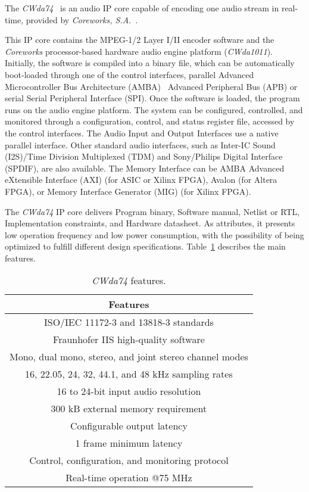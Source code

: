 The \textit{CWda74}~\cite{CWda74} is an audio IP core capable of encoding one audio stream in real-time, provided by \textit{Coreworks, S.A.}~\cite{coreworks}.

This IP core contains the MPEG-1/2 Layer I/II encoder software and the \textit{Coreworks} processor-based hardware audio engine platform (\textit{CWda1011}). 
Initially, the software is compiled into a binary file, which can be automatically boot-loaded through one of the control interfaces, parallel Advanced Microcontroller Bus Architecture (AMBA)~\cite{bib:axi_amba} Advanced Peripheral Bus (APB) or serial Serial Peripheral Interface (SPI). 
Once the software is loaded, the program runs on the audio engine platform. The system can be configured, controlled, and monitored through a configuration, control, and status register file, accessed by the control interfaces.  
The Audio Input and Output Interfaces use a native parallel interface. Other standard audio interfaces, such as Inter-IC Sound (I2S)/Time Division Multiplexed (TDM) and Sony/Philips Digital Interface (SPDIF), are also available.
The Memory Interface can be AMBA Advanced eXtensible Interface (AXI) (for ASIC or Xilinx FPGA), Avalon (for Altera~\cite{bib:intel} FPGA), or Memory Interface Generator (MIG) (for Xilinx FPGA).

The \textit{CWda74} IP core delivers Program binary, Software manual, Netlist or RTL, Implementation constraints, and Hardware datasheet. 
As attributes, it presents low operation frequency and low power consumption, with the possibility of being optimized to fulfill different design specifications.
Table~\ref{tab:coreworks} describes the main features.

\vspace{0.5cm}

\begin{table}[H]
    \centering
    \begin{tabular}{|c|}
        \hline
        \textbf{Features} \\
        \hline
         ISO/IEC 11172-3 and 13818-3 standards \\
         \hline
         Fraunhofer IIS high-quality software\\
         \hline
         Mono, dual mono, stereo, and joint stereo channel modes \\
         \hline
         16, 22.05, 24, 32, 44.1, and 48 kHz sampling rates \\
         \hline
         16 to 24-bit input audio resolution \\
         \hline
         300 kB external memory requirement\\
         \hline
         Configurable output latency \\
         \hline
         1 frame minimum latency\\
         \hline
         Control, configuration, and monitoring protocol \\
         \hline
         Real-time operation @75 MHz \\
         \hline
    \end{tabular}
    \caption{\textit{CWda74} features.}
    \label{tab:coreworks}
\end{table}

